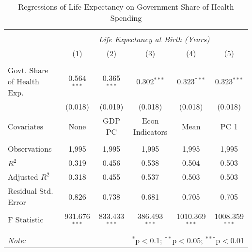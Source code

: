 \begin{table}[!htbp] \centering
  \caption{Regressions of Life Expectancy on Government Share of Health Spending \label{main_regs}}
\begin{tabular}{@{\extracolsep{5pt}}lccccc}
\\[-1.8ex]\hline
\hline \\[-1.8ex]
& \multicolumn{5}{c}{\textit{Life Expectancy at Birth (Years)}} \
\cr \
\\[-1.8ex] & (1) & (2) & (3) & (4) & (5) \\
\hline \\[-1.8ex]
 Govt. Share of Health Exp. & 0.564$^{***}$ & 0.365$^{***}$ & 0.302$^{***}$ & 0.323$^{***}$ & 0.323$^{***}$ \\
  & (0.018) & (0.019) & (0.018) & (0.018) & (0.018) \\
 Covariates & None & GDP PC & Econ Indicators & Mean & PC 1 \\
\hline \\[-1.8ex]
 Observations & 1,995 & 1,995 & 1,995 & 1,995 & 1,995 \\
 $R^2$ & 0.319 & 0.456 & 0.538 & 0.504 & 0.503 \\
 Adjusted $R^2$ & 0.318 & 0.455 & 0.537 & 0.503 & 0.503 \\
 Residual Std. Error & 0.826 & 0.738 & 0.681 & 0.705 & 0.705  \\
 F Statistic & 931.676$^{***}$  & 833.433$^{***}$  & 386.493$^{***}$  & 1010.369$^{***}$  & 1008.359$^{***}$  \\
\hline
\hline \\[-1.8ex]
\textit{Note:} & \multicolumn{5}{r}{$^{*}$p$<$0.1; $^{**}$p$<$0.05; $^{***}$p$<$0.01} \\
\end{tabular}
\end{table}